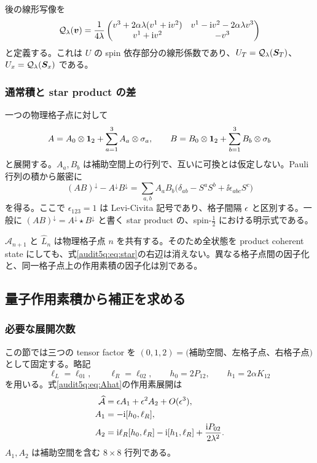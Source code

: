 後の線形写像を
\begin{equation}
\mathcal Q_{\lambda}(\bm v)=\frac1{4\lambda}
\begin{pmatrix}
v^3+2\alpha\lambda(v^1+\mathrm i v^2)&v^1-\mathrm i v^2-2\alpha\lambda v^3\\
v^1+\mathrm i v^2&-v^3
\end{pmatrix}
\label{audit5q:eq:Qmap}
\end{equation}
と定義する。これは $U$ の spin 依存部分の線形係数であり、$U_T=\mathcal Q_{\lambda}(\boldsymbol S_T)$、$U_x=\mathcal Q_{\lambda}(\boldsymbol S_x)$ である。

\subsubsection{通常積と star product の差}

一つの物理格子点に対して
\begin{equation}
A=A_0\otimes\mathbf 1_2+\sum_{a=1}^3A_a\otimes\sigma_a,
\qquad
B=B_0\otimes\mathbf 1_2+\sum_{b=1}^3B_b\otimes\sigma_b
\end{equation}
と展開する。$A_a,B_b$ は補助空間上の行列で、互いに可換とは仮定しない。Pauli 行列の積から厳密に
\begin{equation}
(AB)^{\downarrow}-A^{\downarrow}B^{\downarrow}
=\sum_{a,b}A_aB_b
\bigl(\delta_{ab}-S^aS^b+\ii\epsilon_{abc}S^c\bigr)
\label{audit5q:eq:star}
\end{equation}
を得る。ここで $\epsilon_{123}=1$ は Levi-Civita 記号であり、格子間隔 $\epsilon$ と区別する。一般に $(AB)^{\downarrow}=A^{\downarrow}\star B^{\downarrow}$ と書く star product の、spin-$\tfrac12$ における明示式である\cite{KS}。

$\widehat{\mathcal A}_{n+1}$ と $\widehat L_n$ は物理格子点 $n$ を共有する。そのため全状態を product coherent state にしても、式\eqref{audit5q:eq:star}の右辺は消えない。異なる格子点間の因子化と、同一格子点上の作用素積の因子化は別である。

\subsection{量子作用素積から補正を求める}
\subsubsection{必要な展開次数}

この節では三つの tensor factor を $(0,1,2)=($補助空間、左格子点、右格子点$)$ として固定する。略記
\begin{equation}
\ell_L=\ell_{01},\qquad\ell_R=\ell_{02},\qquad
h_0=2P_{12},\qquad h_1=2\alpha K_{12}
\end{equation}
を用いる。式\eqref{audit5q:eq:Ahat}の作用素展開は
\begin{align}
\widehat{\mathcal A}&=\epsilon A_1+\epsilon^2 A_2+O(\epsilon^3),\label{audit5q:eq:Aexpand}\\
A_1&=-\mathrm i[h_0,\ell_R],\label{audit5q:eq:A1}\\
A_2&=\mathrm i\ell_R[h_0,\ell_R]-\mathrm i[h_1,\ell_R]
+\frac{\mathrm i P_{02}}{2\lambda^2}.\label{audit5q:eq:A2}
\end{align}
$A_1,A_2$ は補助空間を含む $8\times8$ 行列である。

